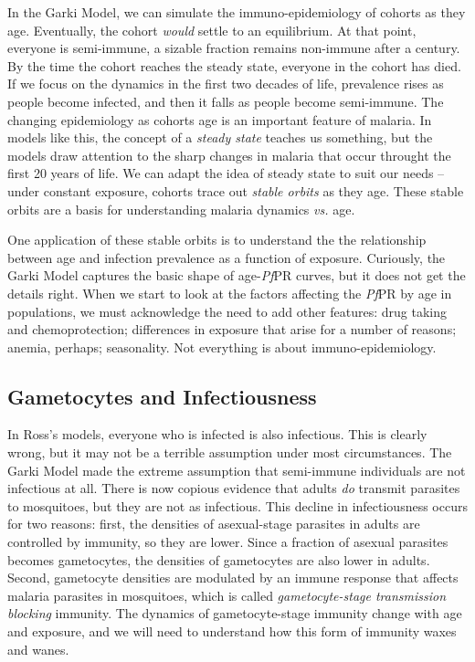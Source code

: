 \documentclass[
]{book}
\begin{document}
In the Garki Model, we can simulate the immuno-epidemiology of cohorts as they age. Eventually, the cohort \emph{would} settle to an equilibrium. At that point, everyone is semi-immune, a sizable fraction remains non-immune after a century. By the time the cohort reaches the steady state, everyone in the cohort has died. If we focus on the dynamics in the first two decades of life, prevalence rises as people become infected, and then it falls as people become semi-immune. The changing epidemiology as cohorts age is an important feature of malaria. In models like this, the concept of a \emph{steady state} teaches us something, but the models draw attention to the sharp changes in malaria that occur throught the first 20 years of life. We can adapt the idea of steady state to suit our needs -- under constant exposure, cohorts trace out \emph{stable orbits} as they age. These stable orbits are a basis for understanding malaria dynamics \emph{vs.} age.

One application of these stable orbits is to understand the the relationship between age and infection prevalence as a function of exposure. Curiously, the Garki Model captures the basic shape of age-\emph{Pf}PR curves, but it does not get the details right. When we start to look at the factors affecting the \emph{Pf}PR by age in populations, we must acknowledge the need to add other features: drug taking and chemoprotection; differences in exposure that arise for a number of reasons; anemia, perhaps; seasonality. Not everything is about immuno-epidemiology.

\hypertarget{gametocytes-and-infectiousness}{%
\subsection{Gametocytes and Infectiousness}\label{gametocytes-and-infectiousness}}

In Ross's models, everyone who is infected is also infectious. This is clearly wrong, but it may not be a terrible assumption under most circumstances. The Garki Model made the extreme assumption that semi-immune individuals are not infectious at all. There is now copious evidence that adults \emph{do} transmit parasites to mosquitoes, but they are not as infectious. This decline in infectiousness occurs for two reasons: first, the densities of asexual-stage parasites in adults are controlled by immunity, so they are lower. Since a fraction of asexual parasites becomes gametocytes, the densities of gametocytes are also lower in adults. Second, gametocyte densities are modulated by an immune response that affects malaria parasites in mosquitoes, which is called \emph{gametocyte-stage transmission blocking} immunity. The dynamics of gametocyte-stage immunity change with age and exposure, and we will need to understand how this form of immunity waxes and wanes.
\end{document}

